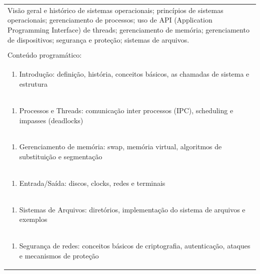 \documentclass[11pt]{article}
\begin{document}
\begin{center}
\begin{longtable}{|p{4cm}|p{4cm}|p{4cm}|p{4cm}|}
\multicolumn{4}{|p{\dimexpr 16cm + 6\tabcolsep\relax}|}{Visão geral e histórico de sistemas operacionais; princípios de sistemas operacionais; gerenciamento de processos; uso de API (Application Programming Interface) de threads; gerenciamento de memória; gerenciamento de dispositivos; segurança e proteção; sistemas de arquivos.}\\
\multicolumn{4}{|p{16cm}|}{}\\
\hline
\multicolumn{4}{|p{16cm}|}{Conteúdo programático:}\\*
\multicolumn{4}{|p{\dimexpr 16cm + 6\tabcolsep\relax}|}{\begin{enumerate}[start=1]\item Introdução: definição, história, conceitos básicos, as chamadas de sistema e estrutura\end{enumerate}}\\
\multicolumn{4}{|p{\dimexpr 16cm + 6\tabcolsep\relax}|}{\begin{enumerate}[start=2]\item Processos e Threads: comunicação inter processos (IPC), scheduling e impasses (deadlocks)\end{enumerate}}\\
\multicolumn{4}{|p{\dimexpr 16cm + 6\tabcolsep\relax}|}{\begin{enumerate}[start=3]\item Gerenciamento de memória: swap, memória virtual, algoritmos de substituição e segmentação\end{enumerate}}\\
\multicolumn{4}{|p{\dimexpr 16cm + 6\tabcolsep\relax}|}{\begin{enumerate}[start=4]\item Entrada/Saída: discos, clocks, redes e terminais\end{enumerate}}\\
\multicolumn{4}{|p{\dimexpr 16cm + 6\tabcolsep\relax}|}{\begin{enumerate}[start=5]\item Sistemas de Arquivos: diretórios, implementação do sistema de arquivos e exemplos\end{enumerate}}\\
\multicolumn{4}{|p{\dimexpr 16cm + 6\tabcolsep\relax}|}{\begin{enumerate}[start=6]\item Segurança de redes: conceitos básicos de criptografia, autenticação, ataques e mecanismos de proteção\end{enumerate}}\\

\end{longtable}
\end{center}
\end{document}
